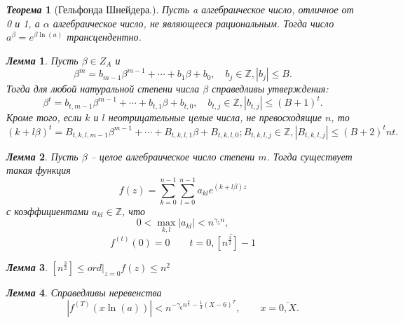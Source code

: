 \documentclass[a4paper,12pt]{article}
\newtheorem{teo2}{\textit{Теорема}}
\newtheorem{lem2}{\textit{Лемма}}
\newcommand{\AL}{\alpha}
\newcommand{\q}{\quad}
\newcommand{\bb}[1]{\mathbb{#1}}
\newcommand{\SL}{\sum\limits}
\begin{document}
\begin{formbox}{}
\begin{teo2}[Гельфонда Шнейдера.]
Пусть a алгебраическое число, отличное от 0 и 1, а $\AL$ алгебраическое число, не являющееся рациональным. Тогда число $a^\beta = e^{\beta \ln (a)}$ трансцендентно.
\end{teo2}
\end{formbox}
\begin{formbox}{}
\begin{lem2}
Пусть \(\beta\in Z_A\) и
\begin{equation}
\beta^m = b_{m-1}\beta^{m-1} + \cdots + b_1\beta + b_0, \q b_j \in \bb{Z}, |b_j| \le B.\end{equation}
Тогда для любой натуральной степени числа $\beta$ справедливы утверждения:\\
$$\beta^t = b_{t,m-1}\beta^{m-1} + \cdots + b_{t,1}\beta + b_{t,0},\q b_{t,j} \in \bb{Z}, |b_{t,j} | \le (B + 1)^t.$$
Кроме того, если $k$ и $l$ неотрицательные целые числа, не превосходящие $n$, то
\[(k + l\beta)^t = B_{t,k,l,m-1}\beta^{m-1} + \cdots + B_{t,k,l,1}\beta + B_{t,k,l,0}; B_{t,k,l,j}\in \bb{Z}, |B_{t,k,l,j} | \le (B + 2)^tnt.\]
\end{lem2}
\end{formbox}
\begin{formbox}{}
\begin{lem2} Пусть $\beta$ -- целое алгебраическое число степени $m$. Тогда существует такая функция \[f(z) = \SL_{k=0}^{n-1}\SL_{l=0}^{n-1} a_{kl}e^{(k+l\beta)z} \]
с коэффициентами $a_{kl}\in\bb{Z}$, что \[0 < \max\limits_{k,l}|a_{kl}|< n^{\gamma_5n},\] \[f^{(t)}(0) = 0\q\q t = \overline{0, [n^\frac{3}{2}]-1} \]
\end{lem2}
\end{formbox}
\begin{formbox}{}
\begin{lem2} $[n^\frac{3}{2}] \le ord|_{z=0}f(z) \le n^2$
\end{lem2}
\end{formbox}
\begin{formbox}{}
\begin{lem2} 
Справедливы неревенства \[|f^{(T)}(x \ln (a))| < n^{-\gamma_6 n^\frac{3}{2} - \frac{1}{3}(X-6)^T},\q\q x=\overline{0, X}. \]
\end{lem2}
\end{formbox}
\end{document}
